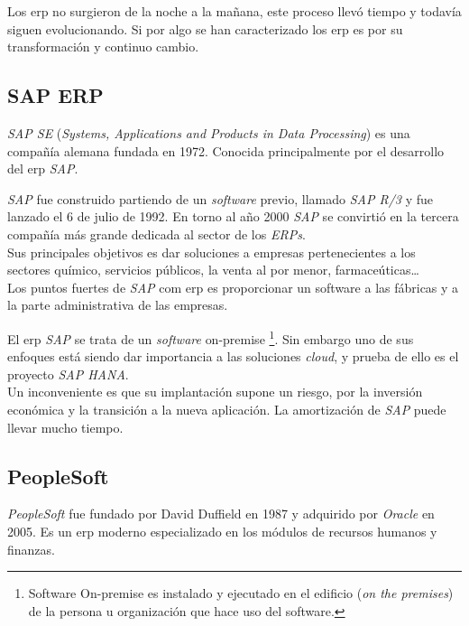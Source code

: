 Los \acrshort{erp} no surgieron de la noche a la mañana, este proceso llevó tiempo y todavía siguen evolucionando. Si por algo se han caracterizado los \acrshort{erp} es por su transformación y continuo cambio.
\cite{hossain_rashid_patrick_2003}
\cite{wiki:erp}
\cite{burgos_2015}

\subsection{SAP ERP}


\textit{SAP SE} (\textit{Systems, Applications and Products in Data Processing}) es una compañía alemana fundada en 1972. Conocida principalmente por el desarrollo del \acrshort{erp} \textit{SAP}.

\textit{SAP} fue construido partiendo de un \textit{software} previo, llamado \textit{SAP R/3} y fue lanzado el 6 de julio de 1992.
En torno al año 2000 \textit{SAP} se convirtió en la tercera compañía más grande dedicada al sector de los \textit{ERPs}.\\

Sus principales objetivos es dar soluciones a empresas pertenecientes a los sectores químico, servicios públicos, la venta al por menor, farmaceúticas\ldots\\

Los puntos fuertes de \textit{SAP} com \acrshort{erp} es proporcionar un software a las fábricas y a la parte administrativa de las empresas.

El \acrshort{erp} \textit{SAP} se trata de un \textit{software} \gls{on-premise} \footnote{Software On-premise es instalado y ejecutado en el edificio (\textit{on the premises}) de la persona u organización que hace uso del software.}.
Sin embargo uno de sus enfoques está siendo dar importancia a las soluciones \textit{cloud}, y prueba de ello es el proyecto \textit{SAP HANA}.\\



Un inconveniente es que su implantación supone un riesgo, por la inversión económica y la transición a la nueva aplicación. La amortización de \textit{SAP} puede llevar mucho tiempo.

\subsection{PeopleSoft}
\textit{PeopleSoft} fue fundado por David Duffield en 1987 y adquirido por \textit{Oracle} en 2005. Es un \acrshort{erp} moderno especializado en los módulos de recursos humanos y finanzas.\\

